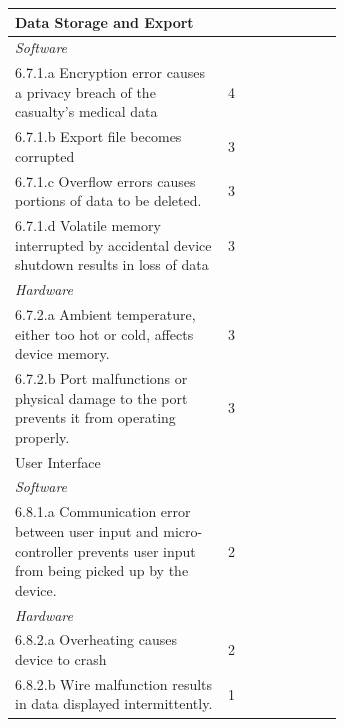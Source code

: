 \documentclass{article}
\begin{document}
\begin{longtable}{|p{0.65\linewidth}|l|}
\hline
\rowcolor{Gray}
Data Storage and Export                                            &                    \\
\hline
\textit{Software}                                                  &                     \\
\hline
6.7.1.a Encryption error causes a privacy breach of the casualty’s medical data                                                                                    & 4                   \\
\hline
6.7.1.b Export file becomes corrupted                            & 3                   \\
\hline
6.7.1.c Overflow errors causes portions of data to be deleted.                                                                                                   & 3                   \\
\hline
6.7.1.d Volatile memory interrupted by accidental device shutdown results in loss of data                                                                        & 3                   \\
\hline
\textit{Hardware}                                                  &                     \\
\hline
6.7.2.a Ambient temperature, either too hot or cold, affects device memory.                                                                                   & 3                   \\
\hline
6.7.2.b Port malfunctions or physical damage to the port prevents it from operating properly.                                                                  & 3                   \\
\hline 
\rowcolor{Gray}
User Interface                                                     &                     \\
\hline
\textit{Software}                                                  &                     \\
\hline
6.8.1.a Communication error between user input and micro-controller prevents user input from being
picked up by the device.                                         & 2                   \\
\hline
\textit{Hardware}                                                  &                     \\
\hline
6.8.2.a Overheating causes device to crash                       & 2                   \\
\hline
6.8.2.b Wire malfunction results in data displayed intermittently.                                                                                            & 1                   \\

\end{longtable}
\end{document}
